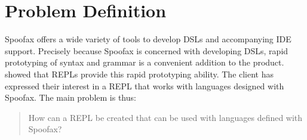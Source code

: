 \section{Problem Definition}
\label{sec:problem-definition}

Spoofax offers a wide variety of tools to develop DSLs and accompanying IDE
support. Precisely because Spoofax is concerned with developing DSLs, rapid
prototyping of syntax and grammar is a convenient addition to the product.
 showed that REPLs provide this rapid prototyping
ability.  The client has expressed their interest in a REPL that
works with languages designed with Spoofax. The main problem is thus:

\begin{quote}
  How can a REPL be created that can be used with languages defined
  with Spoofax?
\end{quote}

